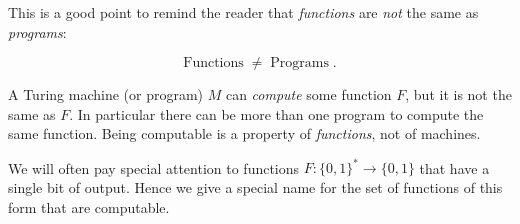 \hypertarget{definecompidea}{}

This is a good point to remind the reader that \emph{functions} are
\emph{not} the same as \emph{programs}:

\[ \text{Functions} \;\neq\; \text{Programs} \;.\]

A Turing machine (or program) \(M\) can \emph{compute} some function
\(F\), but it is not the same as \(F\). In particular there can be more
than one program to compute the same function. Being computable is a
property of \emph{functions}, not of machines.

We will often pay special attention to functions
\(F:\{0,1\}^* \rightarrow \{0,1\}\) that have a single bit of output.
Hence we give a special name for the set of functions of this form that
are computable.

\hypertarget{classRdef}{}

